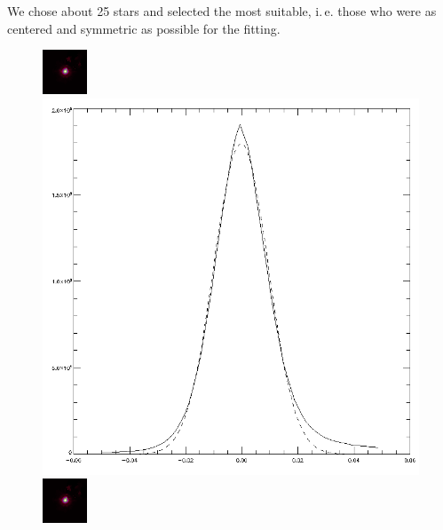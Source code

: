 We chose about 25 stars and selected the most suitable, i.\,e. those who were as centered and symmetric as possible for the fitting. 
\begin{figure}[H]

\begin{minipage}{0.2 \textwidth}
		\includegraphics[scale = 1.9]{figures/Exposures/PSF_I}
\end{minipage}
\begin{minipage}{0.2 \textwidth}
\vspace{3pt}
\hspace{15pt}
		\includegraphics[scale=0.14]{figures/Exposures/psf_noise_I.png}
\end{minipage}
\hspace{50pt}
\begin{minipage}{0.2 \textwidth}
		\includegraphics[scale = 1.9]{figures/Exposures/PSF_I}
\end{minipage}
\begin{minipage}{0.2\textwidth}

\end{minipage}
\end{figure}
